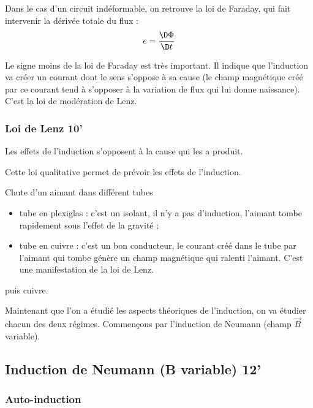 Dans le cas d'un circuit indéformable, on retrouve la loi de Faraday, qui fait intervenir la dérivée totale du flux :
\begin{equation}
e = \frac{\D \Phi}{\D t}
\end{equation}

\begin{transition}
Le signe moins de la loi de Faraday est très important.
Il indique que l'induction va créer un courant dont le sens s'oppose à sa cause (le champ magnétique créé par ce courant tend à s'opposer à la variation de flux qui lui donne naissance).
C'est la loi de modération de Lenz.
\end{transition}

\subsubsection{Loi de Lenz 10'}

Les effets de l'induction s'opposent à la cause qui les a produit.

Cette loi qualitative permet de prévoir les effets de l'induction.

\begin{experience}
Chute d'un aimant dans différent tubes
\begin{itemize}
\item tube en plexiglas : c'est un isolant, il n'y a pas d'induction, l'aimant tombe rapidement sous l'effet de la gravité ;
\item tube en cuivre : c'est un bon conducteur, le courant créé dans le tube par l'aimant qui tombe génère un champ magnétique qui ralenti l'aimant.
C'est une manifestation de la loi de Lenz.
\end{itemize}  puis cuivre.
\end{experience}

\begin{transition}
Maintenant que l'on a étudié les aspects théoriques de l'induction, on va étudier chacun des deux régimes.
Commençons par l'induction de Neumann (champ $\overrightarrow{B}$ variable).
\end{transition}

\subsection{Induction de Neumann (B variable) 12'}

\subsubsection{Auto-induction}


